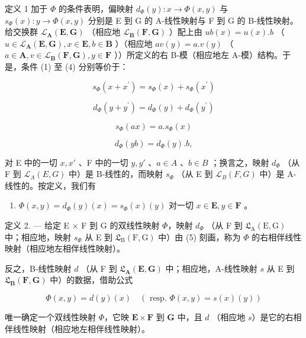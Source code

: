 定义 1 加于 \(\Phi\) 的条件表明，偏映射 \(d_{\Phi}(y): x \to \Phi(x, y)\) 与 \(s_{\Phi}(x): y \to \Phi(x, y)\) 分别是 E 到 G 的 A-线性映射与 F 到 G 的 B-线性映射。给交换群 \(\mathcal{L}_{\mathbf{A}}(\mathbf{E}, \mathbf{G})\) （相应地 \(\mathcal{L}_{\mathbf{B}}(\mathbf{F}, \mathbf{G})\) ）配上由 \(ub(x) = u(x). b\) （ \(u \in \mathcal{L}_{\mathbf{A}}(\mathbf{E}, \mathbf{G}), x \in \mathbf{E}, b \in \mathbf{B}\) ）（相应地 \(av(y) = a. v(y)\) （ \(a \in \mathbf{A}, v \in \mathcal{L}_{\mathbf{B}}(\mathbf{F}, \mathbf{G}), y \in \mathbf{F}\) ））所定义的右 B-模（相应地左 A-模）结构。于是，条件 (1) 至 (4) 分别等价于：

\[
s _ {\Phi} (x + x ^ {\prime}) = s _ {\Phi} (x) + s _ {\Phi} (x ^ {\prime})\tag{1'}
\]

\[
d _ {\Phi} (y + y ^ {\prime}) = d _ {\Phi} (y) + d _ {\Phi} (y ^ {\prime})\tag{2'}
\]

\[
s _ {\Phi} (a x) = a. s _ {\Phi} (x)\tag{3'}
\]

\[
d _ {\Phi} (y b) = d _ {\Phi} (y). b,\tag{4'}
\]

对 E 中的一切 \(x, x'\) 、F 中的一切 \(y, y'\) 、\(a \in A\) 、\(b \in B\) ；换言之，映射 \(d_{\Phi}\) （从 F 到 \(\mathcal{L}_{A}(E, G)\) 中）是 B-线性的，而映射 \(s_{\Phi}\) （从 E 到 \(\mathcal{L}_{B}(F, G)\) 中）是 A-线性的。按定义，我们有

\begin{enumerate}
\def\labelenumi{(\arabic{enumi})}
\setcounter{enumi}{4}
\tightlist
\item
  \(\Phi(x, y) = d_{\Phi}(y)(x) = s_{\Phi}(x)(y)\) 对一切 \(x \in \mathbf{E}, y \in \mathbf{F}\) 。
\end{enumerate}

定义 2. --- 给定 E × F 到 G 的双线性映射 \(\Phi\)，映射 \(d_{\Phi}\) （从 F 到 \(\mathfrak{L}_{\mathrm{A}}(\mathrm{E}, \mathrm{G})\) 中；相应地，映射 \(s_{\Phi}\) 从 E 到 \(\mathfrak{L}_{\mathrm{B}}(\mathrm{F}, \mathrm{G})\) 中）由 (5) 刻画，称为 \(\Phi\) 的右相伴线性映射（相应地左相伴线性映射）。

反之，B-线性映射 \(d\) （从 F 到 \(\mathfrak{L}_{\mathbf{A}}(\mathbf{E},\mathbf{G})\) 中；相应地，A-线性映射 \(s\) 从 E 到 \(\mathfrak{L}_{\mathbf{B}}(\mathbf{F},\mathbf{G})\) 中）的数据，借助公式

\[
\Phi (x, y) = d (y) (x) \quad (\text { resp. } \Phi (x, y) = s (x) (y))
\]

唯一确定一个双线性映射 \(\Phi\)，它映 \(\mathbf{E} \times \mathbf{F}\) 到 \(\mathbf{G}\) 中，且 \(d\) （相应地 \(s\)）是它的右相伴线性映射（相应地左相伴线性映射）。

